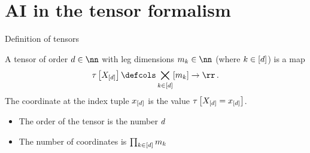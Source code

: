 \documentclass{beamer}
\begin{document}
    {\frame[plain]{\titlepage}}
    \showoutlineatsection


    \section{AI in the tensor formalism}

    \begin{frame}{Definition of tensors}

        \begin{definition}[Tensor]
            A tensor of order $\catorder\in\nn$ with leg dimensions $\catdimof{\catenumerator}\in\nn$ (where $k\in[d]$) is a map
            \begin{align*}
                \hypercorewith \defcols \facstates \rightarrow \rr \, .
            \end{align*}
            The coordinate at the index tuple $x_{[d]}$ is the value $\tau\left[X_{[d]}=x_{[d]}\right]$.
        \end{definition}

        \begin{itemize}
            \item The order of the tensor is the number $d$
            \item The number of coordinates is $\prod_{k\in[d]}m_{k}$
        \end{itemize}


    \end{frame}
\end{document}
